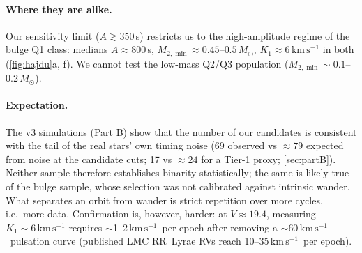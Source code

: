 \documentclass[11pt]{article}
\newcommand{\Msun}{\ensuremath{M_\odot}}
\newcommand{\kms}{\ensuremath{\mathrm{km\,s^{-1}}}}
\begin{document}
\paragraph{Where they are alike.} Our sensitivity limit ($A\gtrsim350$\,s) restricts us to the high-amplitude regime of the
bulge Q1 class: medians $A\approx800$\,s, $M_{2,\min}\approx0.45$--$0.5\,\Msun$, $K_1\approx6\,\kms$ in both
(\cref{fig:hajdu}a, f). We cannot test the low-mass Q2/Q3 population ($M_{2,\min}\sim0.1$--$0.2\,\Msun$).

\paragraph{Expectation.} The v3 simulations (Part B) show that the number of our candidates is consistent with the tail of the
real stars' own timing noise (69 observed vs $\approx79$ expected from noise at the candidate cuts; 17 vs $\approx24$ for a Tier-1 proxy; \cref{sec:partB}).
Neither sample therefore establishes binarity statistically; the same is likely true of the bulge sample, whose selection was not
calibrated against intrinsic wander. What separates an orbit from wander is strict repetition over more cycles, i.e.\ more data. Confirmation is, however, harder: at $V\approx19.4$,
measuring $K_1\sim6\,\kms$ requires $\sim$1--2\,\kms\ per epoch after removing a $\sim$60\,\kms\ pulsation curve
(published LMC RR~Lyrae RVs reach 10--35\,\kms\ per epoch).
\end{document}
